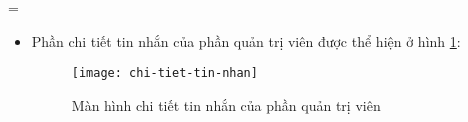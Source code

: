 =\documentclass[../Thesis.tex]{subfiles}
\begin{document}
\begin{itemize}
                \item Phần chi tiết tin nhắn của phần quản trị viên được thể hiện ở hình \ref{fig:chi-tiet-tin-nhan}:
                \begin{figure}[hbt!]
                    \centering\texttt{[image: chi-tiet-tin-nhan]}
                    \caption{Màn hình chi tiết tin nhắn của phần quản trị viên}
                    \label{fig:chi-tiet-tin-nhan}
                \end{figure}
                \FloatBarrier
        \end{itemize}


    
\end{document}
